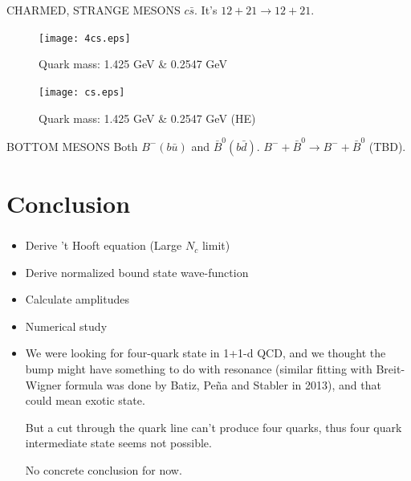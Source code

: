 \documentclass[8pt]{beamer}
\begin{document}
\begin{frame}
	CHARMED, STRANGE MESONS
	$c\bar s$.
	It's $12+21\rightarrow12+21$.

	\begin{minipage}{0.49\linewidth}
		\begin{figure}[H]
			\centering
			\texttt{[image: 4cs.eps]}
			\caption{Quark mass: 1.425 GeV \& 0.2547 GeV }
			\label{fig:csbar}
		\end{figure}
	\end{minipage}
	\begin{minipage}{0.49\linewidth}
		\begin{figure}[H]
			\centering
			\texttt{[image: cs.eps]}
			\caption{Quark mass: 1.425 GeV \& 0.2547 GeV (HE)}
			\label{fig:csbair2}
		\end{figure}
	\end{minipage}

	BOTTOM MESONS Both $B^{-}(b\bar u)$ and $\bar B^{0}(b \bar d)$.
	$B^-+\bar B^0\rightarrow B^-+\bar B^0$ (TBD).

\end{frame}

\section{Conclusion}
\begin{frame}
	\frametitle{\insertsectionhead}
	\begin{itemize}
		\item Derive 't Hooft equation (Large $N_c$ limit)
		\item Derive normalized bound state wave-function
		\item Calculate amplitudes
		\item Numerical study
		\item We were looking for four-quark state in 1+1-d QCD, and we thought the bump might have something to do with resonance (similar fitting with Breit-Wigner formula was done by Batiz, Pe\~na and Stabler in 2013), and that could mean exotic state.

		      But a cut through the quark line can't produce four quarks, thus four quark intermediate state seems not possible.

		      No concrete conclusion for now.
	\end{itemize}

\end{frame}
\end{document}
